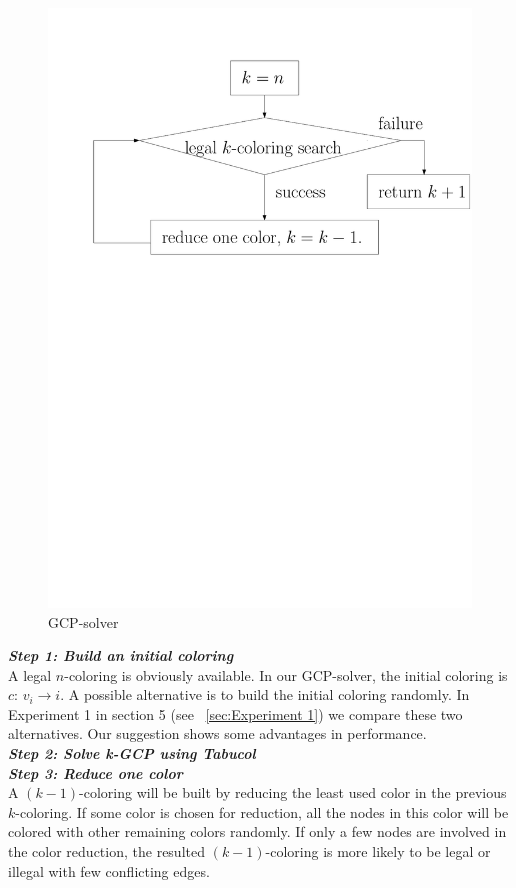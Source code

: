 \documentclass[12pt,a4paper,twoside]{scrartcl}
\numberwithin{equation}{section}
\begin{document}
\begin{figure}[h!]
\centering
  \includegraphics[scale = 0.5]{1/gcpSolver.pdf}
  \caption{GCP-solver}
  \end{figure}
\emph{\textbf{Step 1: Build an initial coloring}}\\
\label{Step 1: Build an Initial Coloring}
A legal $n$-coloring is obviously available. In our GCP-solver, the initial coloring is $c$: $v_i\rightarrow i$. A possible alternative is to build the initial coloring randomly. In Experiment 1 in section 5 (see ~\ref{sec:Experiment 1}) we compare these two alternatives. Our suggestion shows some advantages in performance.\\ 

\emph{\textbf{Step 2: Solve k-GCP using Tabucol}}\\

 
\emph{\textbf{Step 3: Reduce one color}}\\
A $(k-1)$-coloring will be built by reducing the least used color in the previous $k$-coloring. If some color is chosen for reduction, all the nodes in this color will be colored with other remaining colors randomly. If only a few nodes are involved in the color reduction, the resulted $(k-1)$-coloring is more likely to be legal or illegal with few conflicting edges.  
\end{document}
